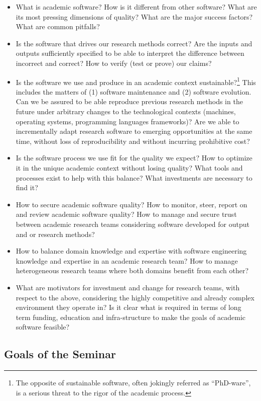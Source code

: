 \documentclass[a4paper,UKenglish]{dagman}
\begin{document}
\begin{itemize}
\item What is academic software? How is it different from other software? What are its most pressing dimensions of quality? What are the major success factors? What are common pitfalls?
\item Is the software that drives our research methods correct? Are the inputs and outputs sufficiently specified to be able to interpret the difference between incorrect and correct? How to verify (test or prove) our claims?
\item Is the software we use and produce in an academic context sustainable?\footnote{The opposite of sustainable software, often jokingly referred as ``PhD-ware'', is a serious threat to the rigor of the academic process.} This includes the matters of (1) software maintenance and (2) software evolution. Can we be assured to be able reproduce previous research methods in the future under arbitrary changes to the technological contexts (machines, operating systems, programming languages frameworks)? Are we able to incrementally adapt research software to emerging opportunities at the same time, without loss of reproducibility and without incurring prohibitive cost?
\item Is the software process we use fit for the quality we expect? How to optimize it in the unique academic context without losing quality? What tools and processes exist to help with this balance? What investments are necessary to find it?
\item How to secure academic software quality? How to monitor, steer, report on and review academic software quality? How to manage and secure trust between academic research teams considering software developed for output and or research methods?
\item How to balance domain knowledge and expertise with software engineering knowledge and expertise in an academic research team? How to manage heterogeneous research teams where both domains benefit from each other?   
\item What are motivators for investment and change for research teams, with respect to the above, considering the highly competitive and already complex environment they operate in? Is it clear what is required in terms of long term funding, education and infra-structure to make the goals of academic software feasible?
\end{itemize}

\subsection*{Goals of the Seminar}
\end{document}
